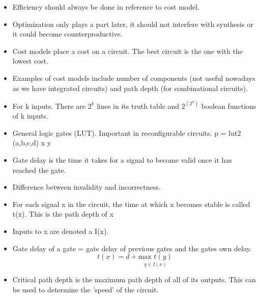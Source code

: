 \documentclass{article}
\begin{document}
\begin{itemize}
\item Efficiency should always be done in reference to cost model.
\item Optimization only plays a part later, it should not interfere with synthesis or it could become counterproductive.
\item Cost models place a cost on a circuit. The best circuit is the one with the lowest cost.
\item Examples of cost models include number of components (not useful nowadays as we have integrated circuits) and path depth (for combinational circuits).
\item For k inputs. There are $2^k$ lines in its truth table and $2^{(2^k)}$ boolean functions of k inputs.
\item General logic gates (LUT). Important in reconfigurable circuits. p = lut2 (a,b,c,d) x y
\item Gate delay is the time it takes for a signal to become valid once it has reached the gate.
\item Difference between invalidity and incorrectness.
\item For each signal x in the circuit, the time at which x becomes stable is called t(x). This is the path depth of x
\item Inputs to x are denoted a I(x).
\item Gate delay of a gate = gate delay of previous gates and the gates own delay. \[ t(x) = d + \underset{y \in I(x)}{\text{max } t(y)} \]
\item Critical path depth is the maximum path depth of all of its outputs. This can be used to determine the 'speed' of the circuit.

\end{itemize}
\end{document}
